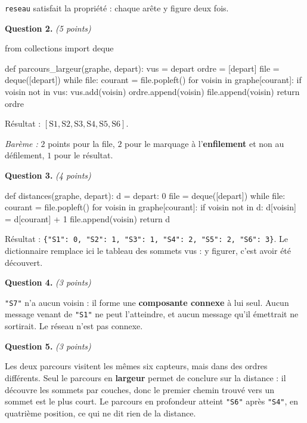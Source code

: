 \lstinline{reseau} satisfait la propriété : chaque arête y figure deux fois.

\medskip
\textbf{Question 2.} \emph{(5 points)}

\begin{python}
from collections import deque

def parcours_largeur(graphe, depart):
    vus = {depart}
    ordre = [depart]
    file = deque([depart])
    while file:
        courant = file.popleft()
        for voisin in graphe[courant]:
            if voisin not in vus:
                vus.add(voisin)
                ordre.append(voisin)
                file.append(voisin)
    return ordre
\end{python}

Résultat : $[\text{S1}, \text{S2}, \text{S3}, \text{S4}, \text{S5},
\text{S6}]$.

\medskip
\emph{Barème :} $2$ points pour la file, $2$ pour le marquage à
l'\textbf{enfilement} et non au défilement, $1$ pour le résultat.

\medskip
\textbf{Question 3.} \emph{(4 points)}

\begin{python}
def distances(graphe, depart):
    d = {depart: 0}
    file = deque([depart])
    while file:
        courant = file.popleft()
        for voisin in graphe[courant]:
            if voisin not in d:
                d[voisin] = d[courant] + 1
                file.append(voisin)
    return d
\end{python}

Résultat : \lstinline!{"S1": 0, "S2": 1, "S3": 1, "S4": 2, "S5": 2, "S6": 3}!.
Le dictionnaire remplace ici le tableau des sommets vus : y figurer, c'est
avoir été découvert.

\medskip
\textbf{Question 4.} \emph{(3 points)}

\lstinline{"S7"} n'a aucun voisin : il forme une \textbf{composante connexe} à
lui seul. Aucun message venant de \lstinline{"S1"} ne peut l'atteindre, et
aucun message qu'il émettrait ne sortirait. Le réseau n'est pas connexe.

\medskip
\textbf{Question 5.} \emph{(3 points)}

Les deux parcours visitent les mêmes six capteurs, mais dans des ordres
différents. Seul le parcours en \textbf{largeur} permet de conclure sur la
distance : il découvre les sommets par couches, donc le premier chemin trouvé
vers un sommet est le plus court. Le parcours en profondeur atteint
\lstinline{"S6"} après \lstinline{"S4"}, en quatrième position, ce qui ne dit
rien de la distance.

